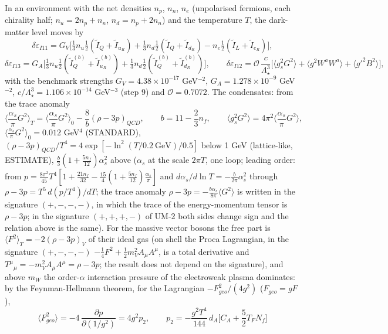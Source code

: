 \documentclass[
  10pt,
]{article}
\begin{document}
In an environment with the net densities \(n_p\), \(n_n\), \(n_e\)
(unpolarised fermions, each chirality half; \(n_u = 2n_p + n_n\),
\(n_d = n_p + 2n_n\)) and the temperature \(T\), the dark-matter level
moves by
\[ \delta\varepsilon_{I11} = G_V\Big[\tfrac13n_u\tfrac12(\tilde I_Q + \tilde I_{u_R}) + \tfrac13n_d\tfrac12(\tilde I_Q + \tilde I_{d_R}) - n_e\tfrac12(\tilde I_L + \tilde I_{e_R})\Big],\]
\[ \delta\varepsilon_{I13} = G_A\Big[\tfrac13n_u\tfrac12(\tilde I^{(b)}_Q + \tilde I^{(b)}_{u_R}) + \tfrac13n_d\tfrac12(\tilde I^{(b)}_Q + \tilde I^{(b)}_{d_R})\Big],\qquad
   \delta\varepsilon_{I12} = \mathcal O\,\frac{c}{\Lambda_\star^3}\Big[\langle g_s^2G^2\rangle + \langle g^2W^aW^a\rangle + \langle g'^2B^2\rangle\Big], \]
with the benchmark strengths \(G_V = 4.38\times10^{-17}\) GeV\(^{-2}\),
\(G_A = 1.278\times10^{-9}\) GeV\(^{-2}\),
\(c/\Lambda_\star^3 = 1.106\times10^{-14}\) GeV\(^{-3}\) (step 9) and
\(\mathcal O = 0.7072\). The condensates: from the trace anomaly
\[ \Big\langle\frac{\alpha_s}{\pi}G^2\Big\rangle_T = \Big\langle\frac{\alpha_s}{\pi}G^2\Big\rangle_0 - \frac{8}{b}(\rho - 3p)_{QCD},\qquad b = 11 - \frac23n_f,\qquad \langle g_s^2G^2\rangle = 4\pi^2\Big\langle\frac{\alpha_s}{\pi}G^2\Big\rangle, \]
\(\langle\frac{\alpha_s}{\pi}G^2\rangle_0 = 0.012\) GeV\(^4\)
(STANDARD),
\((\rho - 3p)_{QCD}/T^4 = 4\exp[-\ln^2(T/0.2\ \text{GeV})/0.5]\) below 1
GeV (lattice-like, ESTIMATE),
\(\frac{b}{3}(1 + \frac{5n_f}{12})\alpha_s^2\) above (\(\alpha_s\) at
the scale \(2\pi T\), one loop; leading order: from
\(p = \frac{8\pi^2}{45}T^4[1 + \frac{21n_f}{32} - \frac{15}{4}(1 + \frac{5n_f}{12})\frac{\alpha_s}{\pi}]\)
and \(d\alpha_s/d\ln T = -\frac{b}{2\pi}\alpha_s^2\) through
\(\rho - 3p = T^5\,d(p/T^4)/dT\); the trace anomaly
\(\rho - 3p = -\frac{b\alpha_s}{8\pi}\langle G^2\rangle\) is written in
the signature \((+,-,-,-)\), in which the trace of the energy-momentum
tensor is \(\rho - 3p\); in the signature \((+,+,+,-)\) of UM-2 both
sides change sign and the relation above is the same). For the massive
vector bosons the free part is
\(\langle F^2\rangle_T = -2(\rho - 3p)_V\) of their ideal gas (on shell
the Proca Lagrangian, in the signature \((+,-,-,-)\)
\(-\frac14F^2 + \frac12m_V^2A_\mu A^\mu\), is a total derivative and
\(T^\mu{}_\mu = -m_V^2A_\mu A^\mu = \rho - 3p\); the result does not
depend on the signature), and above \(m_W\) the order-\(\alpha\)
interaction pressure of the electroweak plasma dominates: by the
Feynman-Hellmann theorem, for the Lagrangian \(-F_{geo}^2/(4g^2)\)
(\(F_{geo} = gF\)),
\[ \langle F_{geo}^2\rangle = -4\,\frac{\partial p}{\partial(1/g^2)} = 4g^2p_2,\qquad p_2 = -\frac{g^2T^4}{144}\,d_A\Big[C_A + \frac52T_FN_f\Big] \]
\end{document}
